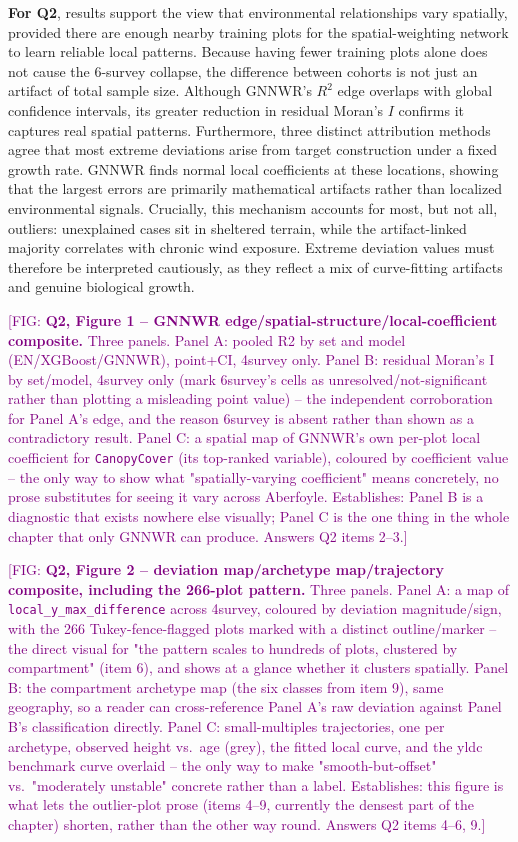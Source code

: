 \documentclass[logo,msc,ai]{infthesis}           %
\newcommand{\fig}[1]{\textcolor{purple}{[FIG: #1]}}
\begin{document}
\textbf{For Q2}, results support the view that environmental relationships vary spatially, provided there are enough nearby training plots for the spatial-weighting network to learn reliable local patterns. Because having fewer training plots alone does not cause the 6-survey collapse, the difference between cohorts is not just an artifact of total sample size. Although GNNWR's $R^2$ edge overlaps with global confidence intervals, its greater reduction in residual Moran's $I$ confirms it captures real spatial patterns. Furthermore, three distinct attribution methods agree that most extreme deviations arise from target construction under a fixed growth rate. GNNWR finds normal local coefficients at these locations, showing that the largest errors are primarily mathematical artifacts rather than localized environmental signals. Crucially, this mechanism accounts for most, but not all, outliers: unexplained cases sit in sheltered terrain, while the artifact-linked majority correlates with chronic wind exposure. Extreme deviation values must therefore be interpreted cautiously, as they reflect a mix of curve-fitting artifacts and genuine biological growth.


\fig{\textbf{Q2, Figure 1 -- GNNWR edge/spatial-structure/local-coefficient
composite.} Three panels. Panel A: pooled R2 by set and model (EN/XGBoost/GNNWR),
point+CI, 4survey only. Panel B: residual Moran's I by set/model, 4survey only (mark
6survey's cells as unresolved/not-significant rather than plotting a misleading point
value) -- the independent corroboration for Panel A's edge, and the reason 6survey is
absent rather than shown as a contradictory result. Panel C: a spatial map of GNNWR's
own per-plot local
coefficient for \texttt{CanopyCover} (its top-ranked variable), coloured by
coefficient value -- the only way to show what "spatially-varying coefficient" means
concretely, no prose substitutes for seeing it vary across Aberfoyle. Establishes:
Panel B is a diagnostic that exists nowhere else visually; Panel C is the one thing in
the whole chapter that only GNNWR can produce. Answers Q2 items 2--3.}

\fig{\textbf{Q2, Figure 2 -- deviation map/archetype map/trajectory composite,
including the 266-plot pattern.} Three panels. Panel A: a map of
\texttt{local\_y\_max\_difference} across 4survey, coloured by deviation
magnitude/sign, with the 266 Tukey-fence-flagged plots marked with a distinct
outline/marker -- the direct visual for "the pattern scales to hundreds of plots,
clustered by compartment" (item 6), and shows at a glance whether it clusters
spatially. Panel B: the compartment archetype map (the six classes from item 9), same
geography, so a reader can cross-reference Panel A's raw deviation against Panel B's
classification directly. Panel C: small-multiples trajectories, one per archetype,
observed height vs.\ age (grey), the fitted local curve, and the yldc benchmark curve
overlaid -- the only way to make "smooth-but-offset" vs.\ "moderately unstable"
concrete rather than a label. Establishes: this figure is what lets the outlier-plot
prose (items 4--9, currently the densest part of the chapter) shorten, rather than the
other way round. Answers Q2 items 4--6, 9.}
\end{document}
